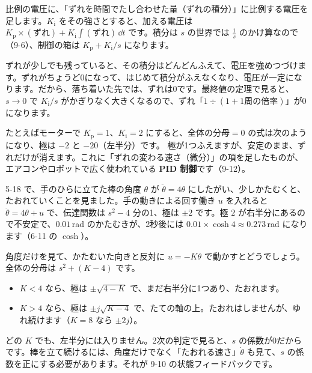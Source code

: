 \begin{motto}[5]
比例の電圧に、「ずれを時間でたし合わせた量（ずれの積分）」に比例する電圧を足します。$K_{\mathrm i}$ をその強さとすると、加える電圧は $K_{\mathrm p}\times(\text{ずれ})+K_{\mathrm i}\int(\text{ずれ})\,\dd t$ です。積分は $s$ の世界では $\frac1s$ のかけ算なので（9-6）、制御の箱は $K_{\mathrm p}+K_{\mathrm i}/s$ になります。

ずれが少しでも残っていると、その積分はどんどんふえて、電圧を強めつづけます。ずれがちょうど0になって、はじめて積分がふえなくなり、電圧が一定になります。だから、落ち着いた先では、ずれは0です。最終値の定理で見ると、$s\to0$ で $K_{\mathrm i}/s$ がかぎりなく大きくなるので、ずれ「$1\div(1+\text{1周の倍率})$」が0になります。

たとえばモーターで $K_{\mathrm p}=1$、$K_{\mathrm i}=2$ にすると、全体の分母$=0$ の式は次のようになり、極は $-2$ と $-20$（左半分）です。
極が1つふえますが、安定のまま、ずれだけが消えます。これに「ずれの変わる速さ（微分）」の項を足したものが、エアコンやロボットで広く使われている \textbf{PID 制御}です（9-12）。
\end{motto}


\label{bk:9-9:migi}5-18 で、手のひらに立てた棒の角度 $\theta$ が $\ddot\theta=4\theta$ にしたがい、少しかたむくと、たおれていくことを見ました。手の動きによる回す働き $u$ を入れると $\ddot\theta=4\theta+u$ で、伝達関数は $s^2-4$ 分の1、極は $\pm2$ です。極 $2$ が右半分にあるので不安定で、$0.01$\,rad のかたむきが、2秒後には $0.01\times\cosh4\approx0.273$\,rad になります（6-11 の $\cosh$）。

角度だけを見て、かたむいた向きと反対に $u=-K\theta$ で動かすとどうでしょう。全体の分母は $s^2+(K-4)$ です。
\begin{itemize}[leftmargin=1.2\zw, itemsep=2pt, topsep=2pt, label={\color{\bkTT}●}]
\item $K<4$ なら、極は $\pm\sqrt{4-K}$ で、まだ右半分に1つあり、たおれます。
\item $K>4$ なら、極は $\pm j\sqrt{K-4}$ で、たての軸の上。たおれはしませんが、ゆれ続けます（$K=8$ なら $\pm2j$）。
\end{itemize}
どの $K$ でも、左半分には入りません。2次の判定で見ると、$s$ の係数が0だからです。棒を立て続けるには、角度だけでなく「たおれる速さ」$\dot\theta$ も見て、$s$ の係数を正にする必要があります。それが 9-10 の状態フィードバックです。

